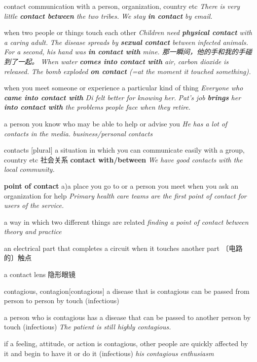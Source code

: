 \begin{DefWord}{contact}
    communication with a person, organization, country etc
    \textit{There is very little \textbf{contact between} the two tribes.}
    \textit{We stay \textbf{in contact} by email.}

    when two people or things touch each other
    \textit{Children need \textbf{physical contact} with a caring adult.}
    \textit{The disease spreads by \textbf{sexual contact} between infected animals.}
    \textit{For a second, his hand was \textbf{in contact with} mine. 那一瞬间，他的手和我的手碰到了一起。}
    \textit{When water \textbf{comes into contact with} air, carbon dioxide is released.}
    \textit{The bomb exploded \textbf{on contact} (=at the moment it touched something).}

    when you meet someone or experience a particular kind of thing
    \textit{Everyone who \textbf{came into contact with} Di felt better for knowing her.}
    \textit{Pat's job \textbf{brings} her \textbf{into contact with} the problems people face when they retire.}

    a person you know who may be able to help or advise you
    \textit{He has a lot of contacts in the media.}
    \textit{business/personal contacts}

    contacts [plural] a situation in which you can communicate easily with a group, country etc 社会关系
    \textbf{contact with/between}
    \textit{We have good contacts with the local community.}

    \textbf{point of contact}
    a)a place you go to or a person you meet when you ask an organization for help
    \textit{Primary health care teams are the first point of contact for users of the service.}

    a way in which two different things are related
    \textit{finding a point of contact between theory and practice}

    an electrical part that completes a circuit when it touches another part 〔电路的〕触点

    a contact lens 隐形眼镜
\end{DefWord}

\begin{DefWord}{contagious, contagion}[contagious]
    a disease that is contagious can be passed from person to person by touch (infectious)

    a person who is contagious has a disease that can be passed to another person by touch (infectious)
    \textit{The patient is still highly contagious.}

    if a feeling, attitude, or action is contagious, other people are quickly affected by it and begin to have it or do it (infectious)
    \textit{his contagious enthusiasm}
\end{DefWord}


